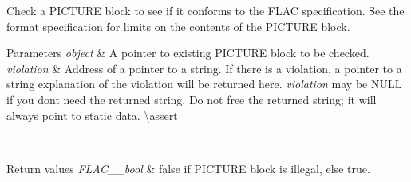 Check a P\+I\+C\+T\+U\+RE block to see if it conforms to the F\+L\+AC specification. See the format specification for limits on the contents of the P\+I\+C\+T\+U\+RE block.


\begin{DoxyParams}{Parameters}
{\em object} & A pointer to existing P\+I\+C\+T\+U\+RE block to be checked. \\
\hline
{\em violation} & Address of a pointer to a string. If there is a violation, a pointer to a string explanation of the violation will be returned here. {\itshape violation} may be {\ttfamily N\+U\+LL} if you don\textquotesingle{}t need the returned string. Do not free the returned string; it will always point to static data. \textbackslash{}assert 
\begin{DoxyCode}{1}
\end{DoxyCode}
 
\begin{DoxyCode}{1}
\end{DoxyCode}
 \\
\hline
\end{DoxyParams}

\begin{DoxyRetVals}{Return values}
{\em F\+L\+A\+C\+\_\+\+\_\+bool} & {\ttfamily false} if P\+I\+C\+T\+U\+RE block is illegal, else {\ttfamily true}. \\
\hline
\end{DoxyRetVals}
\mbox{\label{group__flac__metadata__object_ga07e5950094528e2954c06d7991d543a8}} 
